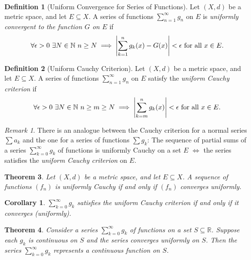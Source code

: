 \documentclass[12pt, lettersize]{book}
\theoremstyle{plain}
\newtheorem{thm}{Theorem}[section]
\newtheorem{cor}{Corollary}[thm]
\theoremstyle{definition}
\newtheorem{dfn}[thm]{Definition}
\theoremstyle{remark}
\newtheorem*{rem}{Remark}
\newcommand{\R}{\mathbb{R}}
\newcommand{\N}{\mathbb{N}}
\begin{document}
		\begin{dfn}[Uniform Convergence for Series of Functions]
			Let $(X,d)$ be a metric space, and let $E\subseteq X$. A series of functions $\sum_{n=1}^{\infty}g_n$ on $E$ is \emph{uniformly convergent to the function $G$ on $E$} if 
			\begin{displaymath}
				\forall\epsilon>0\ \exists N\in\N\ n\geq N\implies\abs{\sum_{k=1}^{n}g_k(x)-G(x)}<\epsilon\text{ for all $x\in E$.}
			\end{displaymath}
		\end{dfn}
		
		\begin{dfn}[Uniform Cauchy Criterion]
			Let $(X,d)$ be a metric space, and let $E\subseteq X$. A series of functions $\sum_{n=1}^{\infty}g_n$ on $E$ satisfy the \emph{uniform Cauchy criterion} if
			\begin{displaymath}
				\forall\epsilon>0\ \exists N\in\N\ n\geq m\geq N\implies \abs{\sum_{k=m}^{n}g_k(x)}<\epsilon\text{ for all $x\in E$.}
			\end{displaymath} 
		\end{dfn}
		\begin{rem}
			There is an analogue between the Cauchy criterion for a normal series $\sum a_k$ and the one for a series of functions $\sum g_k$: The sequence of partial sums of a series $\sum_{k=0}^{\infty}g_k$ of functions is uniformly Cauchy on a set $E$ $\iff$ the series satisfies the \emph{uniform Cauchy criterion} on $E$.
		\end{rem}
		
		\setcounter{equation}{0}
		\begin{thm}\label{thm:25.4}
			Let $(X,d)$ be a metric space, and let $E\subseteq X$. A sequence of functions $(f_n)$ is \emph{uniformly Cauchy} if and only if $(f_n)$ converges uniformly.
		\end{thm}
	
		\begin{cor}
			$\sum_{k=0}^{\infty}g_k$ satisfies the uniform Cauchy criterion if and only if it converges (uniformly).
		\end{cor}
		
		\begin{thm}\label{thm:25.5}
			Consider a series $\sum_{k=0}^{\infty}g_k$ of functions on a set $S\subseteq\R$. Suppose each $g_k$ is continuous on $S$ and the series converges uniformly on $S$. Then the series $\sum_{k=0}^{\infty}g_k$ represents a continuous function on $S$.
		\end{thm}
		
\end{document}
